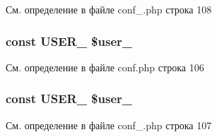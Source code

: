 См. определение в файле conf\-\_\-.\-php строка 108

\hypertarget{group___d_b__2_ga92b63a34ae60895214a8f31ebb5e9b58}{
\subsubsection[{U\-S\-E\-R\-\_\-2}]{\setlength{\rightskip}{0pt plus 5cm}const U\-S\-E\-R\-\_ \$user\-\_}}\label{group___d_b__2_ga92b63a34ae60895214a8f31ebb5e9b58}


См. определение в файле conf.\-php строка 106

\hypertarget{group___d_b__2_ga92b63a34ae60895214a8f31ebb5e9b58}{
\subsubsection[{U\-S\-E\-R\-\_\-2}]{\setlength{\rightskip}{0pt plus 5cm}const U\-S\-E\-R\-\_ \$user\-\_}}\label{group___d_b__2_ga92b63a34ae60895214a8f31ebb5e9b58}


См. определение в файле conf\-\_\-.\-php строка 107

